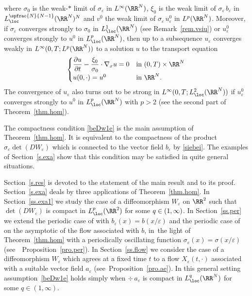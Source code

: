 where $\sigma_0$ is the weak-$\ast$ limit of $\sigma_\varepsilon$ in $L^\infty(\RR^N)$, $\xi_0$ is the weak limit of $\sigma_\varepsilon\,b_\varepsilon$ in $L^{\spfrac{N}{N-1}}_\loc(\RR^N)^N$ and $v^0$ the weak limit of $\sigma_\varepsilon\,u_\varepsilon^0$ in $L^p(\RR^N)$. Moreover, if $\sigma_\varepsilon$ converges strongly to $\sigma_0$ in $L^1_\loc(\RR^N)$ (see Remark~\ref{rem.vsiu}) or $u_\varepsilon^0$ converges strongly to $u^0$ in $L^p_\loc(\RR^N)$, then up to a subsequence $u_\varepsilon$ converges weakly in $L^\infty(0,T;L^p(\RR^N))$ to a solution $u$ to the transport equation
\begin{equation}\label{equ1}
\begin{cases}
\dfrac{\partial u}{\partial t}-\dfrac{\xi_0}{\sigma_0}\cdot\nabla_x u=0 & \mbox{in }(0,T)\times\RR^N
\\[5pt]
u(0,\cdot)=u^0 & \mbox{in }\RR^N.
\end{cases}
\end{equation}
The convergence of $u_\varepsilon$ also turns out to be strong in $L^\infty(0,T;L^2_\loc(\RR^N))$ if $u_\varepsilon^0$ converges strongly to $u^0$ in $L^p_\loc(\RR^N)$ with $p>2$ (see the second part of Theorem~\ref{thm.hom}).

The compactness condition \eqref{beDw1e} is the main assumption of Theorem~\ref{thm.hom}. It is equivalent to the compactness of the product $\sigma_\varepsilon\det(DW_\varepsilon)$ which is connected to the vector field $b_\varepsilon$ by \eqref{siebei}. The examples of Section~\ref{s.exa} show that this condition may be satisfied in quite general situations.

Section~\ref{s.res} is devoted to the statement of the main result and to its proof.
Section~\ref{s.exa} deals by three applications of Theorem~\ref{thm.hom}.
In Section~\ref{ss.exa1} we study the case of a diffeomorphism $W_\varepsilon$ on $\RR^2$ such that $\det(DW_\varepsilon)$ is compact in $L^p_\loc(\RR^2)$ for some $q\in\nobreak (1,\infty)$. In Section~\ref{ss.per} we extend the periodic case of \cite{Bre,HoXi,Tas} with $b_\varepsilon(x)=b(x/\varepsilon)$ and the periodic case of \cite[\S 4]{Bri} on the asymptotic of the flow associated with $b$, in~the light of Theorem~\ref{thm.hom} with a periodically oscillating function $\sigma_\varepsilon(x)=\sigma(x/\varepsilon)$ (see~ Proposition~\ref{pro.per}). In Section~\ref{ss.flow} we consider the case of a diffeomorphism $W_\varepsilon$ which agrees at a fixed time $t$ to a flow $X_\varepsilon(t,\cdot)$ associated with a suitable vector field $a_\varepsilon$ (see~Proposition~\ref{pro.ae}). In this general setting assumption~\eqref{beDw1e} holds simply when $\div\,a_\varepsilon$ is compact in $L^q_\loc(\RR^N)$ for some $q\in(1,\infty)$.

